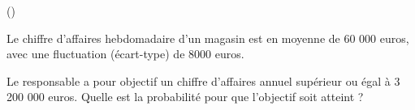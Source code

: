 \begin{exercice}\label{exoInf2} (\minsyndical)

Le chiffre d'affaires hebdomadaire d'un magasin est en moyenne de 60 000 euros, avec une fluctuation (\'ecart-type) de 8000 euros.

\medskip

Le responsable a pour objectif un chiffre d'affaires annuel sup\'erieur ou \'egal \`a 3 200 000 euros. Quelle est la probabilit\'e pour que l'objectif soit atteint ?

\bigskip


\end{exercice}
